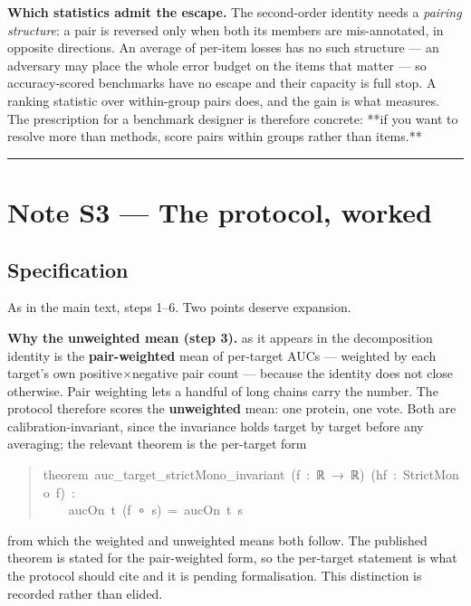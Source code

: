 \textbf{Which statistics admit the escape.} The second-order identity needs a
\emph{pairing structure}: a pair is reversed only when both its members are
mis-annotated, in opposite directions. An average of per-item losses has no such
structure --- an adversary may place the whole error budget on the items that
matter --- so accuracy-scored benchmarks have no escape and their capacity is
 full stop. A ranking statistic over within-group pairs does, and the
gain is what  measures. The prescription for a benchmark designer is
therefore concrete: **if you want to resolve more than  methods, score
pairs within groups rather than items.**


\vspace{0.5em}\hrule\vspace{0.8em}



\section*{Note S3 --- The protocol, worked}


\subsection*{Specification}

As in the main text, steps 1--6. Two points deserve expansion.

\textbf{Why the unweighted mean (step 3).}  as it appears in the
decomposition identity is the \textbf{pair-weighted} mean of per-target AUCs ---
weighted by each target's own positive$\times$negative pair count --- because the
identity does not close otherwise. Pair weighting lets a handful of long chains
carry the number. The protocol therefore scores the \textbf{unweighted} mean: one
protein, one vote. Both are calibration-invariant, since the invariance holds
target by target before any averaging; the relevant theorem is the per-target
form

\begin{quote}\ttfamily\footnotesize\begin{flushleft}
theorem~auc\_target\_strictMono\_invariant~(f~:~ℝ~→~ℝ)~(hf~:~StrictMono~f)~:\\
~~~~aucOn~t~(f~∘~s)~=~aucOn~t~s\\
\end{flushleft}\end{quote}

from which the weighted and unweighted means both follow. The published theorem
 is stated for the pair-weighted form, so the
per-target statement is what the protocol should cite and it is pending
formalisation. This distinction is recorded rather than elided.

